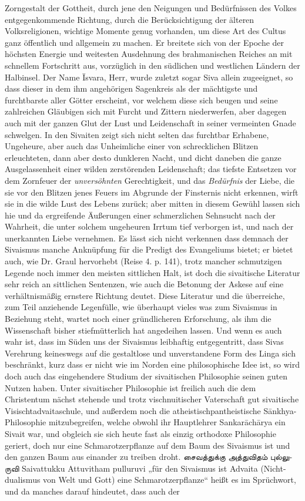 \documentclass{article}
\newcommand{\TamilText}[1]{\texttamil{#1}}
\newcommand{\tam}[1]{\TamilText{#1}}
\begin{document}
Zorngestalt der Gottheit, durch jene den Neigungen und Bedürfnissen des Volkes entgegenkommende Richtung, durch die Berücksichtigung der älteren Volksreligionen, wichtige Momente genug vorhanden, um diese Art des Cultus ganz öffentlich und allgemein zu machen. Er breitete sich von der Epoche der höchsten Energie und weitesten Ausdehnung des brahmanischen Reiches an mit schnellem Fortschritt aus, vorzüglich in den südlichen und westlichen Ländern der Halbinsel. Der Name \={I}svara, Herr, wurde zuletzt sogar Siva allein zugeeignet, so dass dieser in dem ihm angehörigen Sagenkreis als der mächtigste und furchtbarste aller Götter erscheint, vor welchem diese sich beugen und seine zahlreichen Gläubigen sich mit Furcht und Zittern niederwerfen, aber dagegen auch mit der ganzen Glut der Lust und Leidenschaft in seiner vermeinten Gnade schwelgen. In den Sivaiten zeigt sich nicht selten das furchtbar Erhabene, Ungeheure, aber auch das Unheimliche einer von schrecklichen Blitzen erleuchteten, dann aber desto dunkleren Nacht, und dicht daneben die ganze Ausgelassenheit einer wilden zerstörenden Leidenschaft; das tiefste Entsetzen vor dem Zornfeuer der \emph{unversöhnten} Gerechtigkeit, und das \emph{Bedürfnis} der Liebe, die sie vor den Blitzen jenes Feuers im Abgrunde der Finsternis nicht erkennen, wirft sie in die wilde Lust des Lebens zurück; aber mitten in diesem Gewühl lassen sich hie und da ergreifende Äußerungen einer schmerzlichen Sehnsucht nach der Wahrheit, die unter solchem ungeheuren Irrtum tief verborgen ist, und nach der unerkannten Liebe vernehmen. Es lässt sich nicht verkennen dass demnach der Sivaismus manche Anknüpfung für die Predigt des Evangeliums bietet; er bietet auch, wie Dr. Graul hervorhebt (Reise 4. p. 141), trotz mancher schmutzigen Legende noch immer den meisten sittlichen Halt, ist doch die sivaitische Literatur sehr reich an sittlichen Sentenzen, wie auch die Betonung der Askese auf eine verhältnismäßig ernstere Richtung deutet. Diese Literatur und die überreiche, zum Teil anziehende Legenfülle, wie überhaupt vieles was zum Sivaismus in Beziehung steht, wartet noch einer gründlicheren Erforschung, als ihm die Wissenschaft bisher stiefmütterlich hat angedeihen lassen. Und wenn es auch wahr ist, dass im Süden uns der Sivaismus leibhaftig entgegentritt, dass Sivas Verehrung keineswegs auf die gestaltlose und unverstandene Form des Linga sich beschränkt, kurz dass er nicht wie im Norden eine philosophische Idee ist, so wird doch auch das eingehendere Studium der sivaitischen Philosophie seinen guten Nutzen haben. Unter sivaitischer Philosophie ist freilich auch die dem Christentum nächst stehende und trotz vischnuitischer Vaterschaft gut sivaitische Visischtadvaitaschule, und außerdem noch die atheistischpantheistische S\={a}nkhya-Philosophie mitzubegreifen, welche obwohl ihr Hauptlehrer Sankar\={a}ch\={a}rya ein Sivait war, und obgleich sie sich heute fast als einzig orthodoxe Philosophie geriert, doch nur eine Schmarotzerpflanze auf dem Baum des Sivaismus ist und den ganzen Baum aus einander zu treiben droht. \tam{சைவத்துக்கு} \tam{அத்துவிதம்} \tam{புல்லுருவி} Saivattukku Attuvitham pulluruvi „für den Sivaismus ist Advaita (Nicht-dualismus von Welt und Gott) eine Schmarotzerpflanze“ heißt es im Sprüchwort, und da manches darauf hindeutet, dass auch der 
\end{document}
